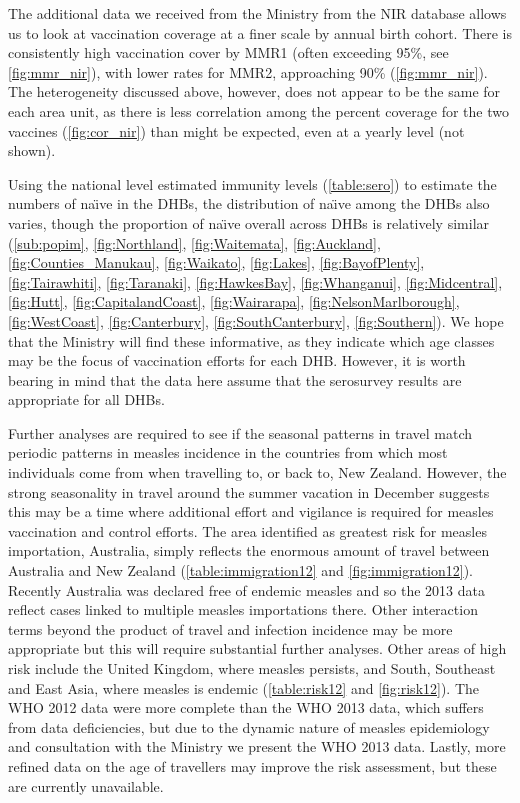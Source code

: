 \documentclass{article}
\begin{document}
The additional data we received from the Ministry from the NIR database allows us to look at vaccination coverage at a finer scale by annual birth cohort. There is consistently high vaccination cover by MMR1 (often exceeding 95\%, see \autoref{fig:mmr_nir}), with lower rates for MMR2, approaching 90\% (\autoref{fig:mmr_nir}). The heterogeneity discussed above, however, does not appear to be the same for each area unit, as there is less correlation among the percent coverage for the two vaccines (\autoref{fig:cor_nir}) than might be expected, even at a yearly level (not shown).

Using the national level estimated immunity levels (\autoref{table:sero}) to estimate the numbers of na\"{\i}ve in the DHBs, the distribution of na\"{\i}ve among the DHBs also varies, though the proportion of na\"{\i}ve overall across DHBs is relatively similar (\autoref{sub:popim}, \autoref{fig:Northland}, \autoref{fig:Waitemata}, \autoref{fig:Auckland}, \autoref{fig:Counties_Manukau}, \autoref{fig:Waikato}, \autoref{fig:Lakes}, \autoref{fig:BayofPlenty}, \autoref{fig:Tairawhiti}, \autoref{fig:Taranaki}, \autoref{fig:HawkesBay}, \autoref{fig:Whanganui}, \autoref{fig:Midcentral}, \autoref{fig:Hutt}, \autoref{fig:CapitalandCoast}, \autoref{fig:Wairarapa}, \autoref{fig:NelsonMarlborough}, \autoref{fig:WestCoast}, \autoref{fig:Canterbury}, \autoref{fig:SouthCanterbury}, \autoref{fig:Southern}).  We hope that the Ministry will find these informative, as they indicate which age classes may be the focus of vaccination efforts for each DHB. However, it is worth bearing in mind that the data here assume that the serosurvey results are appropriate for all DHBs.

Further analyses are required to see if the seasonal patterns in travel match periodic patterns in measles incidence in the countries from which most individuals come from when travelling to, or back to, New Zealand. However, the strong seasonality in travel around the summer vacation in December suggests this may be a time where additional effort and vigilance is required for measles vaccination and control efforts. The area identified as greatest risk for measles importation, Australia, simply reflects the enormous amount of travel between Australia and New Zealand (\autoref{table:immigration12} and \autoref{fig:immigration12}). Recently Australia was declared free of endemic measles and so the 2013 data reflect cases linked to multiple measles importations there. Other interaction terms beyond the product of travel and infection incidence may be more appropriate but this will require substantial further analyses. Other areas of high risk include the United Kingdom, where measles persists, and South, Southeast and East Asia, where measles is endemic (\autoref{table:risk12} and \autoref{fig:risk12}). The WHO 2012 data were more complete than the WHO 2013 data, which suffers from data deficiencies, but due to the dynamic nature of measles epidemiology and consultation with the Ministry we present the WHO 2013 data. Lastly, more refined data on the age of travellers may improve the risk assessment, but these are currently unavailable.
\end{document}
